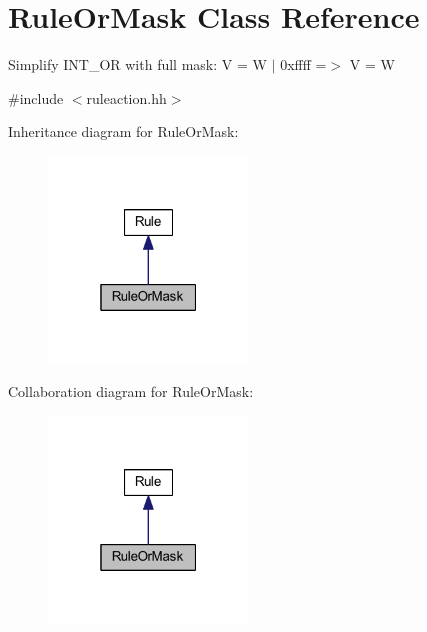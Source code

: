 \hypertarget{class_rule_or_mask}{}\section{Rule\+Or\+Mask Class Reference}
\label{class_rule_or_mask}


Simplify I\+N\+T\+\_\+\+OR with full mask\+: {\ttfamily V = W $\vert$ 0xffff =$>$ V = W}  




{\ttfamily \#include $<$ruleaction.\+hh$>$}



Inheritance diagram for Rule\+Or\+Mask\+:
\nopagebreak
\begin{figure}[H]
\begin{center}
\leavevmode
\includegraphics[width=151pt]{class_rule_or_mask__inherit__graph}
\end{center}
\end{figure}


Collaboration diagram for Rule\+Or\+Mask\+:
\nopagebreak
\begin{figure}[H]
\begin{center}
\leavevmode
\includegraphics[width=151pt]{class_rule_or_mask__coll__graph}
\end{center}
\end{figure}
